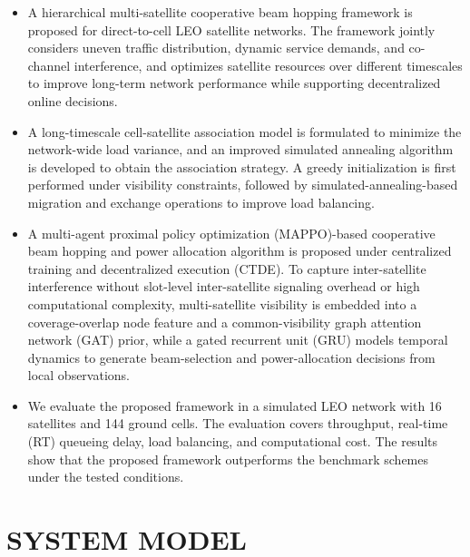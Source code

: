 \documentclass[journal]{IEEEtran}
\begin{document}
{\setlength{\parskip}{0pt}%
\begin{itemize}[\setlength{\topsep}{2pt}]
\item A hierarchical multi-satellite cooperative beam hopping framework is proposed for direct-to-cell LEO satellite networks. The framework jointly considers uneven traffic distribution, dynamic service demands, and co-channel interference, and optimizes satellite resources over different timescales to improve long-term network performance while supporting decentralized online decisions.
\item A long-timescale cell-satellite association model is formulated to minimize the network-wide load variance, and an improved simulated annealing algorithm is developed to obtain the association strategy. A greedy initialization is first performed under visibility constraints, followed by simulated-annealing-based migration and exchange operations to improve load balancing.
\item A multi-agent proximal policy optimization (MAPPO)-based cooperative beam hopping and power allocation algorithm is proposed under centralized training and decentralized execution (CTDE). To capture inter-satellite interference without slot-level inter-satellite signaling overhead or high computational complexity, multi-satellite visibility is embedded into a coverage-overlap node feature and a common-visibility graph attention network (GAT) prior, while a gated recurrent unit (GRU) models temporal dynamics to generate beam-selection and power-allocation decisions from local observations.
\item We evaluate the proposed framework in a simulated LEO network with 16 satellites and 144 ground cells. The evaluation covers throughput, real-time (RT) queueing delay, load balancing, and computational cost. The results show that the proposed framework outperforms the benchmark schemes under the tested conditions.
\end{itemize}
}

\section{SYSTEM MODEL}
\label{sec:system-model}
\end{document}
